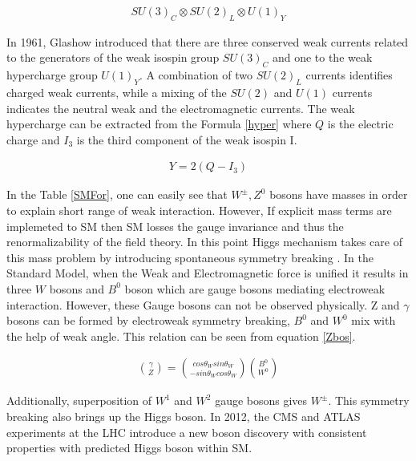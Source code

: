 \documentclass[12pt,oneandhalf,chaparabic,phys,ms,eng]{metu}
\begin{document}
\begin{eqnarray}
\label{gauge}
	SU(3)_{C} \otimes SU(2)_{L} \otimes U(1)_{Y}
\end{eqnarray}

In 1961, Glashow introduced that there are three conserved weak currents related to the generators of the weak isospin group $SU(3)_{C}$ and one to the weak hypercharge group $U(1)_{Y}$.  A combination of two $SU(2)_{L}$ currents identifies charged weak currents, while a mixing of the $SU(2)$ and $U(1)$ currents indicates the neutral weak and the electromagnetic currents. The weak hypercharge can be extracted from the Formula \ref{hyper} where $Q$ is the electric charge and $I_{3}$ is the third component of the weak isospin I.

\begin{eqnarray}
\label{hyper}
	Y=2(Q-I_{3})
\end{eqnarray}

In the Table \ref{SMFor}, one can easily see that $W^\pm , Z^0$ bosons have masses in order to explain short range of weak interaction. However, If explicit mass terms are implemeted to SM then SM losses the gauge invariance and thus the renormalizability of the field theory. In this point Higgs mechanism takes care of this mass problem by introducing spontaneous symmetry breaking \cite{SM}.
In the Standard Model, when the Weak and Electromagnetic force is unified it results in three $W$ bosons and $B^0$ boson which are gauge bosons mediating electroweak interaction. However, these Gauge bosons can not be observed physically. Z and  $\gamma$ bosons can be formed by electroweak symmetry breaking, $B^0$ and $W^0$ mix with the help of weak angle. This relation can be seen from equation \ref{Zbos}. 

\begin{eqnarray}
\label{Zbos}
	{ \gamma \choose Z } = { cos \theta_W  sin \theta_W \choose -sin \theta_W cos \theta_W  } { B^0 \choose W^0 }
\end{eqnarray}

Additionally, superposition of $W^1$ and $W^2$ gauge bosons gives $W^{\pm}$. This symmetry breaking also brings up the Higgs boson. In 2012, the CMS \cite{RSM1} and ATLAS \cite{RSM2} experiments at the LHC introduce a new boson discovery with consistent properties with predicted Higgs boson within SM. 
\end{document}
